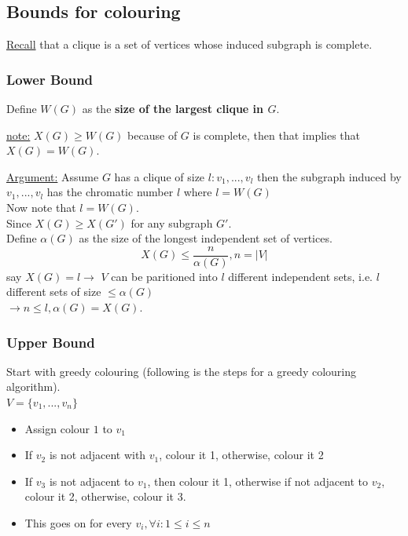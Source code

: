 \documentclass[12pt]{article}
\begin{document}
\subsection{Bounds for colouring}

\underline{Recall} that a clique is a set of vertices whose induced subgraph is complete.

\subsubsection{Lower Bound}

Define $W(G)$ as the \textbf{size of the largest clique in $G$}.

\begin{tcolorbox}
	\underline{note:} $X(G) \geq W(G)$ because of $G$ is complete, then that implies that $X(G) = W(G)$.
\end{tcolorbox}

\underline{Argument:} Assume $G$ has a clique of size $l : v_1, ..., v_l$ then the subgraph induced by $v_1, ... ,v_l$ has the chromatic number $l$ where $l = W(G)$\\
Now note that $l = W(G)$.\\
Since $X(G) \geq X(G')$ for any subgraph $G'$.\\
Define $\alpha (G)$ as the size of the longest independent set of vertices.\\
$$X(G) \leq \frac{n}{\alpha (G)}, n=|V|$$
say $X(G) = l \longrightarrow$ $V$ can be paritioned into $l$ different independent sets, i.e. $l$ different sets of size $\leq \alpha (G)$\\
$\longrightarrow n \leq l, \alpha (G) = X(G)$.

\subsubsection{Upper Bound}

Start with greedy colouring (following is the steps for a greedy colouring algorithm).\\
$V = \{ v_1, ..., v_n \}$
\begin{itemize}
	\item{Assign colour $1$ to $v_1$}
	\item{If $v_2$ is not adjacent with $v_1$, colour it 1, otherwise, colour it 2}
	\item{If $v_3$ is not adjacent to $v_1$, then colour it 1, otherwise if not adjacent to $v_2$, colour it 2, otherwise, colour it 3.}
	\item{This goes on for every $v_i, \forall i : 1\leq i \leq n$}
\end{itemize}
\end{document}
